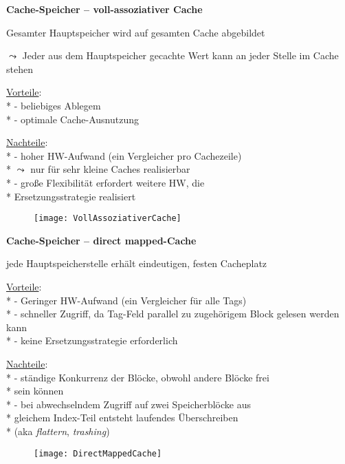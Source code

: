 \textbf{Cache-Speicher -- voll-assoziativer Cache}
\begin{items}
	\item Gesamter Hauptspeicher wird auf gesamten Cache abgebildet
	\item \( \leadsto \) Jeder aus dem Hauptspeicher gecachte Wert kann an jeder Stelle im Cache stehen
	\item \underline{Vorteile}: \\*
		- beliebiges Ablegem \\*
		- optimale Cache-Ausnutzung
	\item \underline{Nachteile}: \\*
		- hoher HW-Aufwand (ein Vergleicher pro Cachezeile) \\*
			\phantom{-} \( \leadsto \) nur für sehr kleine Caches realisierbar\\*
		- große Flexibilität erfordert weitere HW, die \\* \phantom{-} Ersetzungsstrategie realisiert
\end{items}
\begin{figure}[H]\centering\label{VollAssoziativerCache}\texttt{[image: VollAssoziativerCache]}\end{figure}

\textbf{Cache-Speicher -- direct mapped-Cache}
\begin{items}
	\item jede Hauptspeicherstelle erhält eindeutigen, festen Cacheplatz
	\item \underline{Vorteile}: \\*
		- Geringer HW-Aufwand (ein Vergleicher für alle Tags) \\*
		- schneller Zugriff, da Tag-Feld parallel zu zugehörigem Block gelesen werden kann \\*
		- keine Ersetzungsstrategie erforderlich
	\item \underline{Nachteile}: \\*
		- ständige Konkurrenz der Blöcke, obwohl andere Blöcke frei \\* \phantom{-} sein können \\*
		- bei abwechselndem Zugriff auf zwei Speicherblöcke aus \\* \phantom{-} gleichem Index-Teil entsteht laufendes Überschreiben \\* \phantom{-} (aka \emph{flattern}, \emph{trashing})
\end{items}
\begin{figure}[H]\centering\label{DirectMappedCache}\texttt{[image: DirectMappedCache]}\end{figure}

